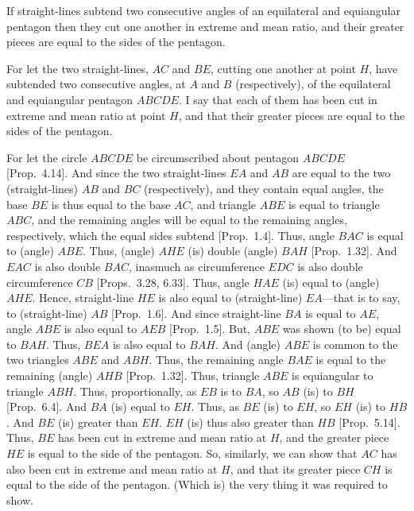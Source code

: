 \begin{Parallel}{}{}
{If straight-lines subtend two consecutive angles of an equilateral and equiangular pentagon then they cut one another in extreme and
mean ratio, and their greater pieces are equal to  the sides of the pentagon.

For let the two straight-lines, $AC$ and $BE$, cutting one another
at point $H$, have subtended  two consecutive angles, at $A$ and $B$ (respectively), of
the equilateral and equiangular pentagon $ABCDE$. I say that
each of them has been cut in extreme and mean ratio at point $H$, and
that their greater pieces are equal to the sides of the pentagon.

\centerline{}

For let the circle $ABCDE$ be circumscribed about pentagon
$ABCDE$ [Prop.~4.14]. And since the two straight-lines $EA$ and
$AB$ are equal to the two (straight-lines) $AB$ and $BC$ (respectively),
and they contain equal angles, the base $BE$ is thus equal to the base
$AC$, and triangle $ABE$ is equal to triangle $ABC$, and the remaining
angles will be equal to the remaining angles, respectively,
which the equal sides subtend [Prop.~1.4]. Thus, angle $BAC$ is equal
to (angle) $ABE$. Thus, (angle) $AHE$ (is) double (angle) $BAH$ [Prop.~1.32]. And $EAC$ is also double $BAC$, inasmuch as
circumference $EDC$ is also double circumference $CB$ [Props.~3.28, 6.33].
Thus, angle $HAE$ (is) equal to (angle) $AHE$. Hence, straight-line
$HE$ is also equal to (straight-line) $EA$---that is to say, to (straight-line)
$AB$ [Prop.~1.6]. And since straight-line $BA$ is equal to $AE$,
angle $ABE$ is also equal to $AEB$ [Prop.~1.5]. But, $ABE$
was shown (to be) equal to $BAH$. Thus, $BEA$ is also equal to
$BAH$. And (angle) $ABE$ is common to the two triangles
$ABE$ and $ABH$. Thus, the remaining angle $BAE$ is equal to
the remaining (angle) $AHB$ [Prop.~1.32]. Thus, triangle $ABE$
is equiangular to triangle $ABH$. Thus, proportionally, as $EB$ is
to $BA$, so $AB$ (is) to $BH$ [Prop.~6.4].  And $BA$ (is) equal to
$EH$. Thus, as $BE$ (is) to $EH$, so $EH$ (is) to $HB$. And
$BE$ (is) greater than $EH$.  $EH$ (is) thus also greater than $HB$
[Prop.~5.14]. Thus, $BE$ has been cut in extreme and mean ratio at
$H$, and the greater piece $HE$ is equal to the side of the pentagon. 
So, similarly, we can show that $AC$ has also been cut in extreme and
mean ratio at $H$, and that  its greater piece $CH$ is equal to the side
of the pentagon. (Which is) the very thing it was required to show.}
\end{Parallel}

